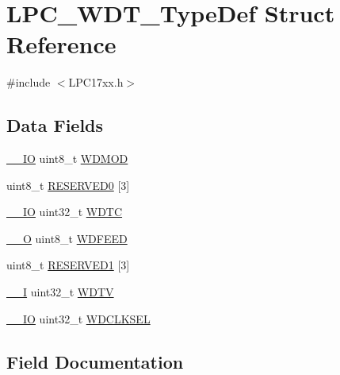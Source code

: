 \hypertarget{structLPC__WDT__TypeDef}{}\section{L\+P\+C\+\_\+\+W\+D\+T\+\_\+\+Type\+Def Struct Reference}
\label{structLPC__WDT__TypeDef}


{\ttfamily \#include $<$L\+P\+C17xx.\+h$>$}

\subsection*{Data Fields}
\begin{DoxyCompactItemize}
\item 
\hyperlink{LPC17xx_8h_aec43007d9998a0a0e01faede4133d6be}{\+\_\+\+\_\+\+IO} uint8\+\_\+t \hyperlink{structLPC__WDT__TypeDef_a43d97828d135ab2479191efbcde299ad}{W\+D\+M\+OD}
\item 
uint8\+\_\+t \hyperlink{structLPC__WDT__TypeDef_a1ee4c20a33fe0ae42acea8483a6df2f5}{R\+E\+S\+E\+R\+V\+E\+D0} \mbox{[}3\mbox{]}
\item 
\hyperlink{LPC17xx_8h_aec43007d9998a0a0e01faede4133d6be}{\+\_\+\+\_\+\+IO} uint32\+\_\+t \hyperlink{structLPC__WDT__TypeDef_a3f3785da39c5efbfbe5f615a23b36d17}{W\+D\+TC}
\item 
\hyperlink{LPC17xx_8h_a7e25d9380f9ef903923964322e71f2f6}{\+\_\+\+\_\+O} uint8\+\_\+t \hyperlink{structLPC__WDT__TypeDef_a8634bafd3c6f17146d04293d7064822b}{W\+D\+F\+E\+ED}
\item 
uint8\+\_\+t \hyperlink{structLPC__WDT__TypeDef_a524d555cdde50ce943fb40d7d4403d82}{R\+E\+S\+E\+R\+V\+E\+D1} \mbox{[}3\mbox{]}
\item 
\hyperlink{LPC17xx_8h_af63697ed9952cc71e1225efe205f6cd3}{\+\_\+\+\_\+I} uint32\+\_\+t \hyperlink{structLPC__WDT__TypeDef_a30e695a8014d4d6e61ef9eaf15a967dc}{W\+D\+TV}
\item 
\hyperlink{LPC17xx_8h_aec43007d9998a0a0e01faede4133d6be}{\+\_\+\+\_\+\+IO} uint32\+\_\+t \hyperlink{structLPC__WDT__TypeDef_a0dfabd1869bff86b6382764df0937ec2}{W\+D\+C\+L\+K\+S\+EL}
\end{DoxyCompactItemize}


\subsection{Field Documentation}
